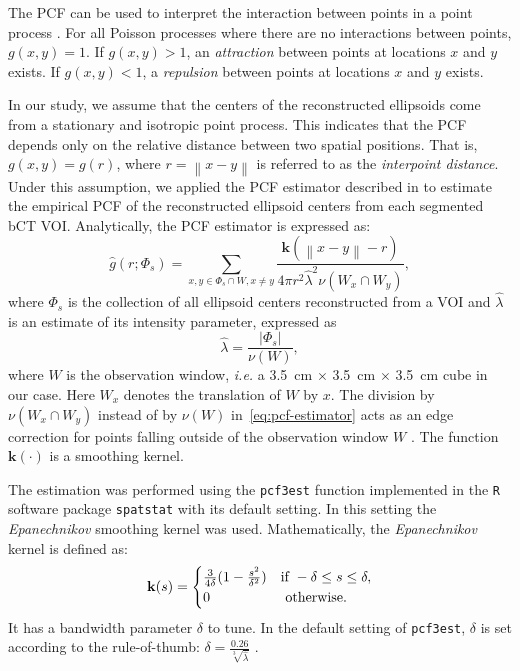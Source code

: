 \documentclass[journal]{IEEEtran}
\newcommand{\norm}[1]{\left\lVert#1\right\rVert}%
\begin{document}
The PCF can be used to interpret the interaction between points in a
point process \cite{illian2008statistical}. For all Poisson processes
where there are no interactions between points, $g(x,y)=1$. If
$g(x,y)>1$, an \textit{attraction} between points at locations $x$ and
$y$ exists. If $g(x,y)<1$, a \textit{repulsion} between points at
locations $x$ and $y$ exists.

In our study, we assume that the centers of the reconstructed
ellipsoids come from a stationary and isotropic point process. This
indicates that the PCF depends only on the relative distance between
two spatial positions. That is, $g(x, y) = g(r)$, where
$r = \norm{x-y}$ is referred to as the \textit{interpoint
  distance}. Under this assumption, we applied the PCF estimator
described in \cite[p.232]{illian2008statistical} to estimate the
empirical PCF of the reconstructed ellipsoid centers from each
segmented bCT VOI. Analytically, the PCF estimator is expressed as:
\begin{equation}
  \label{eq:pcf-estimator}
  \hat{g}(r; \Phi_s) = \sum_{x, y \in \Phi_s \cap W, x \neq y}
  \frac{\mathbf{k}(\norm{x-y} - r)}
  {4 \pi r^2 \hat{\lambda}^2 \nu(W_x \cap W_y)},
\end{equation}
where $\Phi_s$ is the collection of all ellipsoid centers
reconstructed from a VOI and $\hat{\lambda}$ is an estimate of its
intensity parameter, expressed as
\begin{equation}
  \label{eq:inten-estimtor}
  \hat{\lambda} = \frac{|\Phi_s|}{\nu(W)},
\end{equation}
where $W$ is the observation window, \textit{i.e.} a \SI{3.5}{\cm}
$\times$ \SI{3.5}{\cm} $\times$ \SI{3.5}{\cm} cube in our case. Here
$W_x$ denotes the translation of $W$ by $x$. The division by
$\nu(W_x \cap W_y)$ instead of by $\nu(W)$ in~\eqref{eq:pcf-estimator}
acts as an edge correction for points falling outside of the
observation window $W$ \cite{ohser1983estimators}. The function
$\mathbf{k}(\cdot)$ is a smoothing kernel.

The estimation was performed using the \texttt{pcf3est} function
implemented in the \texttt{R} software package \texttt{spatstat}
\cite{baddeley2005spatstat} with its default setting. In this setting
the \textit{Epanechnikov} smoothing kernel \cite{chiu2013stochastic}
was used. Mathematically, the \textit{Epanechnikov} kernel is defined
as:
\begin{equation}
  \label{eq:epan-kernel}
  \mathbf{k}(s) =
  \begin{cases}
    \frac{3}{4\delta} (1 - \frac{s^2}{\delta^2}) & \textnormal{if }
    -\delta \leq s \leq \delta, \\
    0 & \textnormal{ otherwise}.
  \end{cases}
\end{equation}
It has a bandwidth parameter $\delta$ to tune. In the default setting
of \texttt{pcf3est}, $\delta$ is set according to the rule-of-thumb:
$\delta = \frac{0.26}{\sqrt[3]{\hat{\lambda}}}$
\cite{baddeley2005spatstat}.
\end{document}
